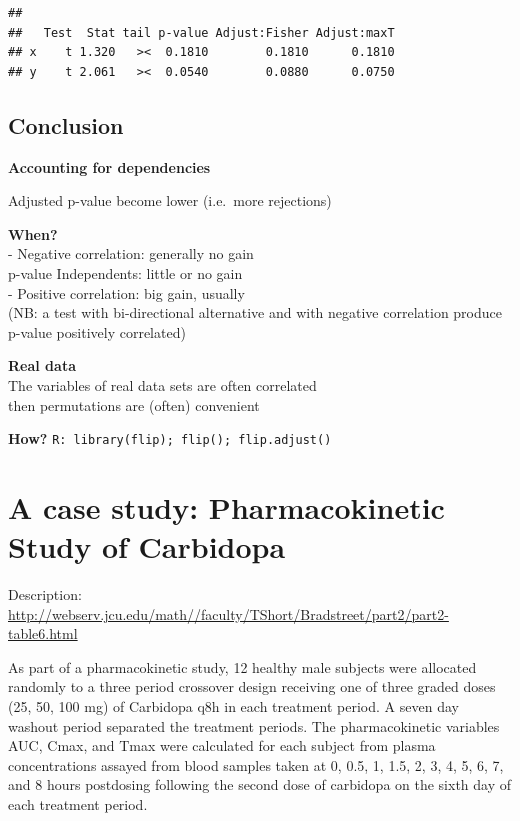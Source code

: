\documentclass[
]{article}
\begin{document}
\begin{verbatim}
## 
##   Test  Stat tail p-value Adjust:Fisher Adjust:maxT
## x    t 1.320   ><  0.1810        0.1810      0.1810
## y    t 2.061   ><  0.0540        0.0880      0.0750
\end{verbatim}

\hypertarget{conclusion-1}{%
\subsection{Conclusion}\label{conclusion-1}}

\textbf{Accounting for dependencies}

Adjusted p-value become lower (i.e.~more rejections)

\textbf{When?}\\
- Negative correlation: generally no gain\\
p-value Independents: little or no gain\\
- Positive correlation: big gain, usually\\
(NB: a test with bi-directional alternative and with negative
correlation produce p-value positively correlated)

\textbf{Real data}\\
The variables of real data sets are often correlated\\
then permutations are (often) convenient

\textbf{How?} \texttt{R:\ library(flip);\ flip();\ flip.adjust()}

\hypertarget{a-case-study-pharmacokinetic-study-of-carbidopa}{%
\section{A case study: Pharmacokinetic Study of
Carbidopa}\label{a-case-study-pharmacokinetic-study-of-carbidopa}}

Description:\\
\url{http://webserv.jcu.edu/math//faculty/TShort/Bradstreet/part2/part2-table6.html}

As part of a pharmacokinetic study, 12 healthy male subjects were
allocated randomly to a three period crossover design receiving one of
three graded doses (25, 50, 100 mg) of Carbidopa q8h in each treatment
period. A seven day washout period separated the treatment periods. The
pharmacokinetic variables AUC, Cmax, and Tmax were calculated for each
subject from plasma concentrations assayed from blood samples taken at
0, 0.5, 1, 1.5, 2, 3, 4, 5, 6, 7, and 8 hours postdosing following the
second dose of carbidopa on the sixth day of each treatment period.
\end{document}
